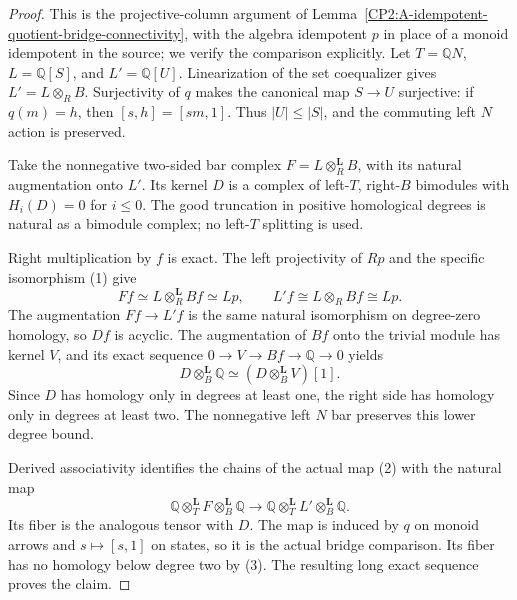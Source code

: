 \begin{proof}
This is the projective-column argument of
Lemma~\ref{CP2:A-idempotent-quotient-bridge-connectivity}, with the
algebra idempotent $p$ in place of a monoid idempotent in the source;
we verify the comparison explicitly.  Let $T=\mathbb QN$,
$L=\mathbb Q[S]$, and $L'=\mathbb Q[U]$.  Linearization of the set
coequalizer gives $L'=L\otimes_R B$.  Surjectivity of $q$ makes the
canonical map $S\to U$ surjective: if $q(m)=h$, then
$[s,h]=[sm,1]$.  Thus $|U|\leq|S|$, and the commuting left $N$ action
is preserved.

Take the nonnegative two-sided bar complex
$F=L\otimes_R^{\mathbf L}B$, with its natural augmentation onto
$L'$.  Its kernel $D$ is a complex of left-$T$, right-$B$ bimodules
with $H_i(D)=0$ for $i\leq0$.  The good truncation in positive
homological degrees is natural as a bimodule complex; no left-$T$
splitting is used.

Right multiplication by $f$ is exact.  The left projectivity of $Rp$
and the specific isomorphism (1) give
\[
 Ff\simeq L\otimes_R^{\mathbf L}Bf\simeq Lp,
 \qquad L'f\cong L\otimes_R Bf\cong Lp.
\]
The augmentation $Ff\to L'f$ is the same natural isomorphism on
degree-zero homology, so $Df$ is acyclic.  The augmentation of $Bf$
onto the trivial module has kernel $V$, and its exact sequence
$0\to V\to Bf\to\mathbb Q\to0$ yields
\[
 D\otimes_B^{\mathbf L}\mathbb Q
       \simeq(D\otimes_B^{\mathbf L}V)[1].                    \tag{3}
\]
Since $D$ has homology only in degrees at least one, the right side
has homology only in degrees at least two.  The nonnegative left
$N$ bar preserves this lower degree bound.

Derived associativity identifies the chains of the actual map (2)
with the natural map
\[
 \mathbb Q\otimes_T^{\mathbf L}F\otimes_B^{\mathbf L}\mathbb Q
 \longrightarrow
 \mathbb Q\otimes_T^{\mathbf L}L'\otimes_B^{\mathbf L}\mathbb Q.
\]
Its fiber is the analogous tensor with $D$.  The map is induced by
$q$ on monoid arrows and $s\mapsto[s,1]$ on states, so it is the
actual bridge comparison.  Its fiber has no homology below degree
two by (3).  The resulting long exact sequence proves the claim.
\end{proof}

